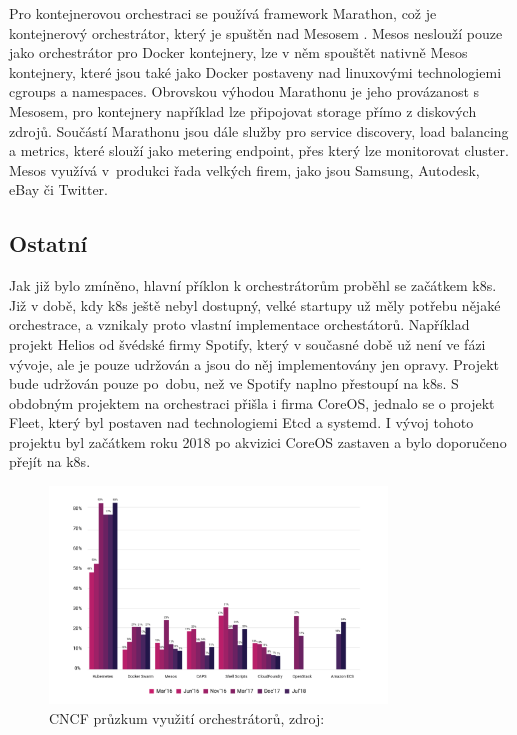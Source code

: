 Pro kontejnerovou orchestraci se používá framework Marathon, což je kontejnerový orchestrátor, který je spuštěn nad Mesosem \cite{marathon}. Mesos neslouží pouze jako orchestrátor pro Docker kontejnery, lze v něm spouštět nativně Mesos kontejnery, které jsou také jako Docker postaveny nad linuxovými technologiemi cgroups a namespaces. Obrovskou výhodou Marathonu je jeho provázanost s Mesosem, pro kontejnery například lze připojovat storage přímo z diskových zdrojů. Součástí Marathonu jsou dále služby pro service discovery, load balancing a metrics, které slouží jako metering endpoint, přes který lze monitorovat cluster. Mesos využívá v produkci řada velkých firem, jako jsou Samsung, Autodesk, eBay či Twitter.

\subsection{Ostatní}
Jak již bylo zmíněno, hlavní příklon k orchestrátorům proběhl se začátkem k8s. Již v době, kdy k8s ještě nebyl dostupný, velké startupy už měly potřebu nějaké orchestrace, a vznikaly proto vlastní implementace orchestátorů. Například projekt Helios od švédské firmy Spotify, který v současné době už není ve fázi vývoje, ale je pouze udržován a jsou do něj implementovány jen opravy. Projekt bude udržován pouze po dobu, než ve Spotify naplno přestoupí na k8s. S obdobným projektem na orchestraci přišla i firma CoreOS, jednalo se o projekt Fleet, který byl postaven nad technologiemi Etcd a systemd. I vývoj tohoto projektu byl začátkem roku 2018 po akvizici CoreOS \cite{coreos_akvizice} zastaven a bylo doporučeno přejít na k8s.

\begin{figure}[H]
\begin{centering}
\includegraphics[width=0.8\textwidth]{img/cncf_k8s_survey.png}
\par\end{centering}
\caption{CNCF průzkum využití orchestrátorů, zdroj: \cite{cncf_survey}} \label{fig:cncf_survey}
\end{figure}

